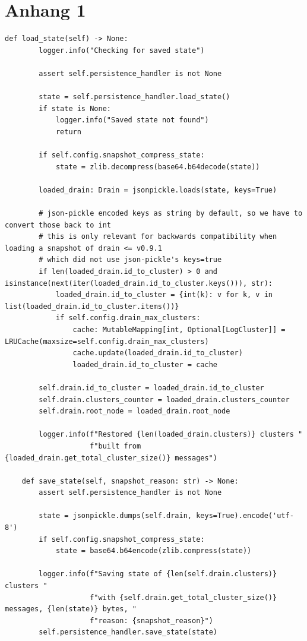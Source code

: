 \chapter{Anhang 1}

\begin{lstlisting}[caption={Ausschnitt aus der TemplateMiner.py von der drain3 Bibliothek}, label={lst:template_miner_py}]
def load_state(self) -> None:
        logger.info("Checking for saved state")

        assert self.persistence_handler is not None

        state = self.persistence_handler.load_state()
        if state is None:
            logger.info("Saved state not found")
            return

        if self.config.snapshot_compress_state:
            state = zlib.decompress(base64.b64decode(state))

        loaded_drain: Drain = jsonpickle.loads(state, keys=True)

        # json-pickle encoded keys as string by default, so we have to convert those back to int
        # this is only relevant for backwards compatibility when loading a snapshot of drain <= v0.9.1
        # which did not use json-pickle's keys=true
        if len(loaded_drain.id_to_cluster) > 0 and isinstance(next(iter(loaded_drain.id_to_cluster.keys())), str):
            loaded_drain.id_to_cluster = {int(k): v for k, v in list(loaded_drain.id_to_cluster.items())}
            if self.config.drain_max_clusters:
                cache: MutableMapping[int, Optional[LogCluster]] = LRUCache(maxsize=self.config.drain_max_clusters)
                cache.update(loaded_drain.id_to_cluster)
                loaded_drain.id_to_cluster = cache

        self.drain.id_to_cluster = loaded_drain.id_to_cluster
        self.drain.clusters_counter = loaded_drain.clusters_counter
        self.drain.root_node = loaded_drain.root_node

        logger.info(f"Restored {len(loaded_drain.clusters)} clusters "
                    f"built from {loaded_drain.get_total_cluster_size()} messages")

    def save_state(self, snapshot_reason: str) -> None:
        assert self.persistence_handler is not None

        state = jsonpickle.dumps(self.drain, keys=True).encode('utf-8')
        if self.config.snapshot_compress_state:
            state = base64.b64encode(zlib.compress(state))

        logger.info(f"Saving state of {len(self.drain.clusters)} clusters "
                    f"with {self.drain.get_total_cluster_size()} messages, {len(state)} bytes, "
                    f"reason: {snapshot_reason}")
        self.persistence_handler.save_state(state)

\end{lstlisting}


